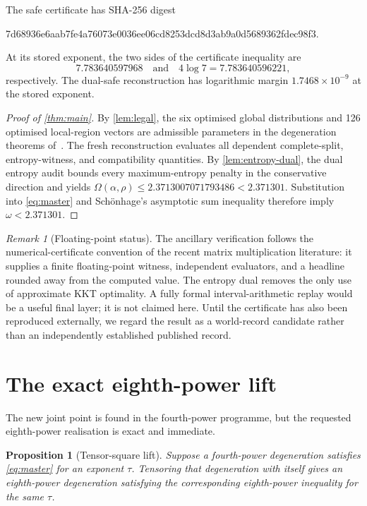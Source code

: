 \documentclass[11pt,reqno]{amsart}
\newtheorem{proposition}[theorem]{Proposition}
\theoremstyle{definition}
\theoremstyle{remark}
\newtheorem{remark}[theorem]{Remark}
\begin{document}
The safe certificate has SHA-256 digest
\begin{center}
\small\ttfamily
7d68936e6aab7fe4a76073e0036ee06cd8253dcd8d3ab9a0d5689362fdec98f3.
\end{center}
At its stored exponent, the two sides of the certificate inequality are
\[
  7.783640597968 \quad\text{and}\quad 4\log 7=7.783640596221,
\]
respectively.  The dual-safe reconstruction has logarithmic margin
$1.7468\times10^{-9}$ at the stored exponent.

\begin{proof}[Proof of \cref{thm:main}]
By \cref{lem:legal}, the six optimised global distributions and 126 optimised local-region vectors are
admissible parameters in the degeneration theorems of~\cite{MoreAsymmetry}.  The fresh reconstruction
evaluates all dependent complete-split, entropy-witness, and compatibility quantities.  By
\cref{lem:entropy-dual}, the dual entropy audit bounds every
maximum-entropy penalty in the conservative direction and yields
$\Omega(\alpha,\rho)\le2.3713007071793486<2.371301$.  Substitution into
\cref{eq:master} and Sch\"onhage's asymptotic sum inequality therefore imply
$\omega<2.371301$.
\end{proof}

\begin{remark}[Floating-point status]\label{rem:floating}
The ancillary verification follows the numerical-certificate convention of the recent matrix
multiplication literature: it supplies a finite floating-point witness, independent evaluators, and a
headline rounded away from the computed value.  The entropy dual removes the only use of approximate
KKT optimality.  A fully formal interval-arithmetic replay would be a useful final layer; it is not claimed
here.  Until the certificate has also been reproduced externally, we regard the result as a world-record
candidate rather than an independently established published record.
\end{remark}

\section{The exact eighth-power lift}

The new joint point is found in the fourth-power programme, but the requested eighth-power realisation is
exact and immediate.

\begin{proposition}[Tensor-square lift]\label{prop:square}
Suppose a fourth-power degeneration satisfies \cref{eq:master} for an exponent $\tau$.  Tensoring that
degeneration with itself gives an eighth-power degeneration satisfying the corresponding eighth-power
inequality for the same $\tau$.
\end{proposition}
\end{document}
